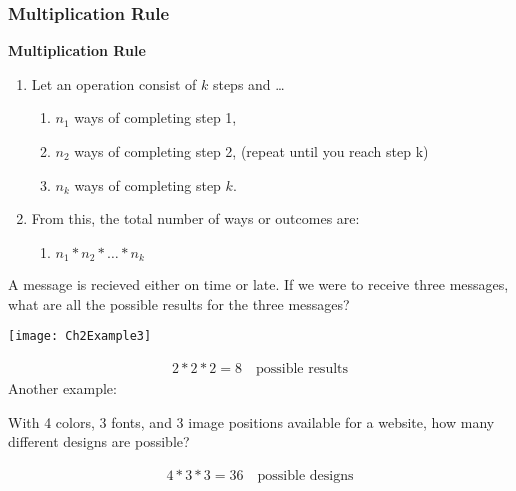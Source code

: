 \documentclass[../INDE315.tex]{subfiles}
\begin{document}
\subsubsection*{Multiplication Rule}
\begin{defn}
    \textbf{Multiplication Rule}
    \begin{enumerate}
        \item Let an operation consist of $k$ steps and \dots 
            \begin{enumerate}
                \item $n_1$ ways of completing step 1, 
                \item $n_2$ ways of completing step 2, (repeat until you reach step k)
                \item $n_k$ ways of completing step $k$.
            \end{enumerate}
        \item From this, the total number of ways or outcomes are:
            \begin{enumerate}
                \item $n_1 * n_2 * \dots * n_k$
            \end{enumerate}
    \end{enumerate}
\end{defn}


\begin{exmp}
    A message is recieved either on time or late. If we were to receive three messages, what are all the possible results for the three messages?
    \begin{center}
        \texttt{[image: Ch2Example3]}
    \end{center}
\end{exmp}
\begin{equation*}
    \begin{aligned}
        2 * 2 * 2 = 8 \quad \text{possible results}
    \end{aligned}
\end{equation*}
Another example:
\begin{exmp}
    With 4 colors, 3 fonts, and 3 image positions available for a website, how many different designs are possible? 
\end{exmp}
\begin{equation*}
    \begin{aligned}
        4 * 3 * 3 = 36 \quad \text{possible designs}
    \end{aligned}
\end{equation*}
\end{document}
